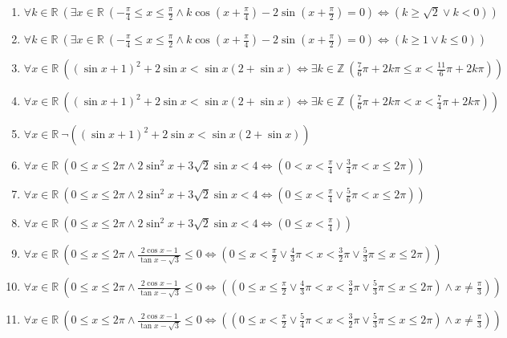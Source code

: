 \documentclass[11pt,a4paper]{article}
\begin{document}
\begin{enumerate}
\item $\displaystyle \forall k \in \mathbb{R}\ \left( \exists x \in \mathbb{R}\ \left( -\frac{\pi}{4} \le x \le \frac{\pi}{2} \land k\cos\left(x + \frac{\pi}{4}\right) - 2\sin\left(x + \frac{\pi}{2}\right) = 0 \right) \iff \left( k \ge \sqrt{2} \lor k < 0 \right) \right)$
\item $\displaystyle \forall k \in \mathbb{R}\ \left( \exists x \in \mathbb{R}\ \left( -\frac{\pi}{4} \le x \le \frac{\pi}{2} \land k\cos\left(x + \frac{\pi}{4}\right) - 2\sin\left(x + \frac{\pi}{2}\right) = 0 \right) \iff \left( k \ge 1 \lor k \le 0 \right) \right)$
\item $\displaystyle \forall x \in \mathbb{R}\ \left( (\sin x + 1)^{2} + 2\sin x < \sin x(2 + \sin x) \iff \exists k \in \mathbb{Z}\ \left( \frac{7}{6}\pi + 2k\pi \le x < \frac{11}{6}\pi + 2k\pi \right) \right)$
\item $\displaystyle \forall x \in \mathbb{R}\ \left( (\sin x + 1)^{2} + 2\sin x < \sin x(2 + \sin x) \iff \exists k \in \mathbb{Z}\ \left( \frac{7}{6}\pi + 2k\pi < x < \frac{7}{4}\pi + 2k\pi \right) \right)$
\item $\displaystyle \forall x \in \mathbb{R}\ \lnot \left( (\sin x + 1)^{2} + 2\sin x < \sin x(2 + \sin x) \right)$
\item $\displaystyle \forall x \in \mathbb{R}\ \left( 0 \le x \le 2\pi \land 2\sin^{2} x + 3\sqrt{2}\sin x < 4 \iff \left( 0 < x < \frac{\pi}{4} \lor \frac{3}{4}\pi < x \le 2\pi \right) \right)$
\item $\displaystyle \forall x \in \mathbb{R}\ \left( 0 \le x \le 2\pi \land 2\sin^{2} x + 3\sqrt{2}\sin x < 4 \iff \left( 0 \le x < \frac{\pi}{4} \lor \frac{5}{6}\pi < x \le 2\pi \right) \right)$
\item $\displaystyle \forall x \in \mathbb{R}\ \left( 0 \le x \le 2\pi \land 2\sin^{2} x + 3\sqrt{2}\sin x < 4 \iff \left( 0 \le x < \frac{\pi}{4} \right) \right)$
\item $\displaystyle \forall x \in \mathbb{R}\ \left( 0 \le x \le 2\pi \land \frac{2\cos x - 1}{\tan x - \sqrt{3}} \le 0 \iff \left( 0 \le x < \frac{\pi}{2} \lor \frac{4}{3}\pi < x < \frac{3}{2}\pi \lor \frac{5}{3}\pi \le x \le 2\pi \right) \right)$
\item $\displaystyle \forall x \in \mathbb{R}\ \left( 0 \le x \le 2\pi \land \frac{2\cos x - 1}{\tan x - \sqrt{3}} \le 0 \iff \left( \left(0 \le x \le \frac{\pi}{2} \lor \frac{4}{3}\pi < x < \frac{3}{2}\pi \lor \frac{5}{3}\pi \le x \le 2\pi\right) \land x \neq \frac{\pi}{3} \right) \right)$
\item $\displaystyle \forall x \in \mathbb{R}\ \left( 0 \le x \le 2\pi \land \frac{2\cos x - 1}{\tan x - \sqrt{3}} \le 0 \iff \left( \left(0 \le x < \frac{\pi}{2} \lor \frac{5}{4}\pi < x < \frac{3}{2}\pi \lor \frac{5}{3}\pi \le x \le 2\pi\right) \land x \neq \frac{\pi}{3} \right) \right)$

\end{enumerate}
\end{document}
